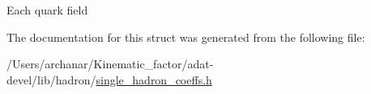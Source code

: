 Each quark field 

The documentation for this struct was generated from the following file\+:\begin{DoxyCompactItemize}
\item 
/\+Users/archanar/\+Kinematic\+\_\+factor/adat-\/devel/lib/hadron/\mbox{\hyperlink{adat-devel_2lib_2hadron_2single__hadron__coeffs_8h}{single\+\_\+hadron\+\_\+coeffs.\+h}}\end{DoxyCompactItemize}
